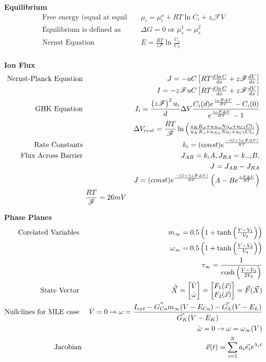 \item \textbf{Equilibrium}
\begin{align*}
\text{Free energy (equal at equil } & & \mu_i = \mu_i^o + RT\ln C_i + z_i\mathscr{F}V \\
%
\text{Equilibrium is defined as } & & \Delta G = 0 \text{ or } \mu_s^1 = \mu_s^2 \\
%
\text{Nernst Equation } & & E = \frac{RT}{z\mathscr{F}}\ln \frac{C_1}{C_2}\\
%
\end{align*}
\item \textbf{Ion Flux}
\begin{align*}
\text{Nernst-Planck Equation } & & J = -u C \bm RT \frac{d \ln C}{dx} + z\mathscr{F} \frac{dV}{dx} \bb \\
%
& & I = -z\mathscr{F} u C  \bm RT \frac{d \ln C}{dx} + z\mathscr{F} \frac{dV}{dx} \bb \\
\text{GHK Equation } & & I_i = \frac{\p z \mathscr{F}\pp^2u_i}{d} \Delta V \frac{C_i(d)\eul{\frac{z_o \mathscr{F} \Delta V}{RT}} - C_i(0)}{\eul{\frac{z_o \mathscr{F} \Delta V}{RT}} -1} \\
& & \Delta V_{rest} = \frac{RT}{\mathscr{F}} \ln \p \frac{u_KK_o + u_{Na}Na_o + u_{Cl}Cl_i}{u_KK_i + u_{Na}Na_i + u_{Cl}Cl_o} \pp \\
%
\text{Rate Constants } & & k_i =  (const) \eul{\frac{-(G+ \lambda z \mathscr{F} \Delta V)}{RT}} \\
%
\text{Flux Across Barrier } & & J_{AB} = k_iA , J_{BA} = k_{-i}B,  \\
& & J = J_{AB} - J_{BA} \\
& & J = (const) \eul{\frac{-(G+ \lambda z \mathscr{F} \Delta V)}{RT}} \p A - B\eul{\frac{z\mathscr{F} \Delta V}{RT} } \pp\\
& \frac{RT}{\mathscr{F}} = 26 mV  &\\
\end{align*}
\item \textbf{Phase Planes}
\begin{align*}
\text{Corelated Variables } & & m_{\infty} = 0.5 \begin{pmatrix} 1+ \tanh \begin{pmatrix} \frac{V-V_1}{V_2} \end{pmatrix} \end{pmatrix} \\
& & \omega_{\infty} = 0.5 \begin{pmatrix} 1+ \tanh \begin{pmatrix} \frac{V-V_3}{V_4} \end{pmatrix} \end{pmatrix} \\
& & \tau_{\infty} = \frac{1}{\cosh \begin{pmatrix} \frac{V-V_3}{2V_4} \end{pmatrix} } \\
\text{State Vector } & & \dot{\vec{X}} = \begin{bmatrix} \dot{V} \\ \dot{\omega} \end{bmatrix} = \begin{bmatrix} F_1(\vec{x}) \\ F_2(\vec{x}) \end{bmatrix} = \vec{F}(\vec{X}) \\
\text{Nullclines for MLE case } & & \dot{V} = 0 \to \omega = \frac{I_{ext} - \vec{G_{Ca}}m_{\infty}(V-E_{Ca}) - \vec{G_L}(V-E_L)}{\vec{G_K}(V-E_K)} \\
& & \dot{\omega} = 0 \to \omega = \omega_{\infty}(V) \\
\text{Jacobian} & & \vec{x}(t) = \sum_{i=1}^{N} a_i\vec{e_i} e^{\lambda_i t}
\end{align*}
